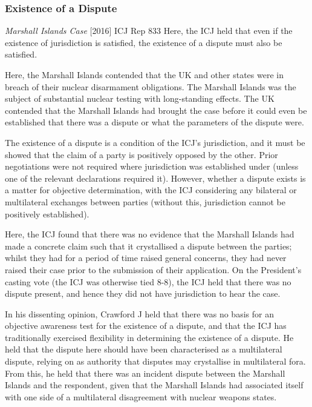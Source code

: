 \subsubsection{Existence of a Dispute}
\begin{casedetails}{\textit{Marshall Islands Case} [2016] ICJ Rep 833}
    \flushleft
    Here, the ICJ held that even if the existence of jurisdiction is satisfied, the existence of a dispute must also be satisfied.

    \vspace{\baselineskip}

    Here, the Marshall Islands contended that the UK and other states were in breach of their nuclear disarmament obligations. The Marshall Islands was the subject of substantial nuclear testing with long-standing effects. The UK contended that the Marshall Islands had brought the case before it could even be established that there was a dispute or what the parameters of the dispute were.

    \vspace{\baselineskip}
    
    The existence of a dispute is a condition of the ICJ's jurisdiction, and it must be showed that the claim of a party is positively opposed by the other. Prior negotiations were not required where jurisdiction was established under  (unless one of the relevant declarations required it). However, whether a dispute exists is a matter for objective determination, with the ICJ considering any bilateral or multilateral exchanges between parties (without this, jurisdiction cannot be positively established).

    \vspace{\baselineskip}

    Here, the ICJ found that there was no evidence that the Marshall Islands had made a concrete claim such that it crystallised a dispute between the parties; whilst they had for a period of time raised general concerns, they had never raised their case prior to the submission of their application. On the President's casting vote (the ICJ was otherwise tied 8-8), the ICJ held that there was no dispute present, and hence they did not have jurisdiction to hear the case.

    In his dissenting opinion, Crawford J held that there was no basis for an objective awareness test for the existence of a dispute, and that the ICJ has traditionally exercised flexibility in determining the existence of a dispute. He held that the dispute here should have been characterised as a multilateral dispute, relying on  as authority that disputes may crystallise in multilateral fora. From this, he held that there was an incident dispute between the Marshall Islands and the respondent, given that the Marshall Islands had associated itself with one side of a multilateral disagreement with nuclear weapons states. 
\end{casedetails}

